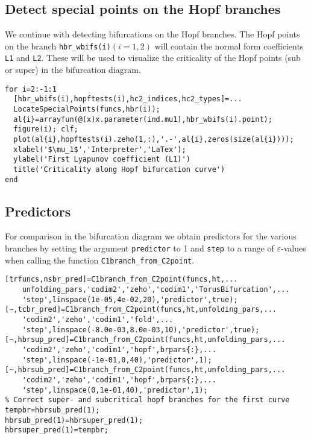 \subsection{Detect special points on the Hopf branches}
We continue with detecting bifurcations on the Hopf branches. The Hopf points on the branch \lstinline|hbr_wbifs(i)|$(i=1,2)$ will contain the normal form coefficients \lstinline|L1| and \lstinline|L2|. These will be used to visualize the criticality of the Hopf points (sub or super) in the bifurcation diagram.
\begin{lstlisting}[style=customMatlab]
%% Detect special points on the Hopf branches
for i=2:-1:1
  [hbr_wbifs(i),hopftests(i),hc2_indices,hc2_types]=...
  LocateSpecialPoints(funcs,hbr(i));
  al{i}=arrayfun(@(x)x.parameter(ind.mu1),hbr_wbifs(i).point);
  figure(i); clf;
  plot(al{i},hopftests(i).zeho(1,:),'.-',al{i},zeros(size(al{i})));
  xlabel('$\mu_1$','Interpreter','LaTex');
  ylabel('First Lyapunov coefficient (L1)')
  title('Criticality along Hopf bifurcation curve')
end
\end{lstlisting}

\subsection{Predictors}
For comparison in the bifurcation diagram we obtain predictors for the various branches by setting the argument \lstinline|predictor| to 1 and \lstinline|step| to a range of $\varepsilon$-values when calling the function \lstinline|C1branch_from_C2point|.
\begin{lstlisting}[style=customMatlab]
%% Predictors for Neimark-Sacker, Hopf and transcritical curves
[trfuncs,nsbr_pred]=C1branch_from_C2point(funcs,ht,...
    unfolding_pars,'codim2','zeho','codim1','TorusBifurcation',...
    'step',linspace(1e-05,4e-02,20),'predictor',true);
[~,tcbr_pred]=C1branch_from_C2point(funcs,ht,unfolding_pars,...
    'codim2','zeho','codim1','fold',...
    'step',linspace(-8.0e-03,8.0e-03,10),'predictor',true);
[~,hbrsup_pred]=C1branch_from_C2point(funcs,ht,unfolding_pars,...
    'codim2','zeho','codim1','hopf',brpars{:},...
    'step',linspace(-1e-01,0,40),'predictor',1);
[~,hbrsub_pred]=C1branch_from_C2point(funcs,ht,unfolding_pars,...
    'codim2','zeho','codim1','hopf',brpars{:},...
    'step',linspace(0,1e-01,40),'predictor',1);
% Correct super- and subcritical hopf branches for the first curve
tempbr=hbrsub_pred(1);
hbrsub_pred(1)=hbrsuper_pred(1);
hbrsuper_pred(1)=tempbr;
\end{lstlisting}

